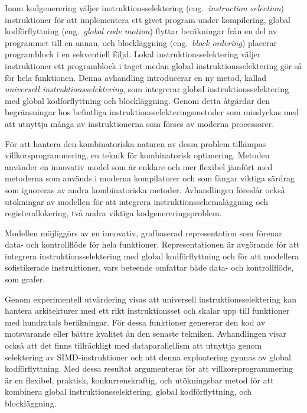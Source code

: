 %

\begin{sammanfattning}
  Inom kodgenerering v\"aljer instruktionsselektering (eng.\ \emph{instruction
    selection}) instruktioner f\"or att implementera ett givet program under
  kompilering, global kodf\"orflyttning (eng.\ \emph{global code motion})
  flyttar ber\"akningar fr\r{a}n en del av programmet till en annan, och
  blockl\"aggning (eng.\ \emph{block ordering}) placerar programblock i en
  sekventiell f\"oljd.
  Lokal instruktionsselektering v\"aljer instruktioner ett programblock i taget
  medan global instruktionsselektering g\"or s\r{a} f\"or hela funktionen.
  Denna avhandling introducerar en ny metod, kallad \emph{universell
    instruktionsselektering}, som integrerar global instruktionsselektering med
  global kodf\"orflyttning och blockl\"aggning.
  Genom detta \r{a}tg\"ardar den begr\"ansningar hos befintliga
  instruktionsselekteringsmetoder som misslyckas med att utnyttja m\r{a}nga av
  instruktionerna som f\"orses av moderna processorer.

  F\"or att hantera den kombinatoriska naturen av dessa problem till\"ampas
  villkorsprogrammering, en teknik f\"or kombinatorisk optimering.
  Metoden anv\"ander en innovativ model som \"ar enklare och mer flexibel
  j\"amf\"ort med metoderna som anv\"ands i moderna kompilatorer och som
  f\r{a}ngar viktiga s\"ardrag som ignoreras av andra kombinatoriska metoder.
  Avhandlingen f\"oresl\r{a}r ocks\r{a} ut\"okningar av modellen f\"or att
  integrera instruktionsschemal\"aggning och registerallokering, tv\r{a} andra
  viktiga kodgenereringsproblem.

  Modellen m\"ojligg\"ors av en innovativ, grafbaserad representation som
  f\"orenar data- och kontrollfl\"ode f\"or hela funktioner.
  Representationen \"ar avg\"orande f\"or att integrera instruktionsselektering
  med global kodf\"orflyttning och f\"or att modellera sofistikerade
  instruktioner, vars beteende omfattar b\r{a}de data- och kontrollfl\"ode, som
  grafer.

  Genom experimentell utv\"ardering visas att universell instruktionsselektering
  kan hantera arkitekturer med ett rikt instruktionsset och skalar upp till
  funktioner med hundratals ber\"akningar.
  F\"or dessa funktioner genererar den kod av motsvarande eller b\"attre
  kvalitet \"an den senaste tekniken.
  Avhandlingen visar ocks\r{a} att det finns tillr\"ackligt med dataparallellism
  att utnyttja genom selektering av SIMD-instruktioner och att denna
  exploatering gynnas av global kodf\"orflyttning.
  Med dessa resultat argumenteras f\"or att villkorsprogrammering \"ar en
  flexibel, praktisk, konkurrenskraftig, och ut\"okningsbar metod f\"or att
  kombinera global instruktionsselektering, global kodf\"orflyttning, och
  blockl\"aggning.
\end{sammanfattning}
